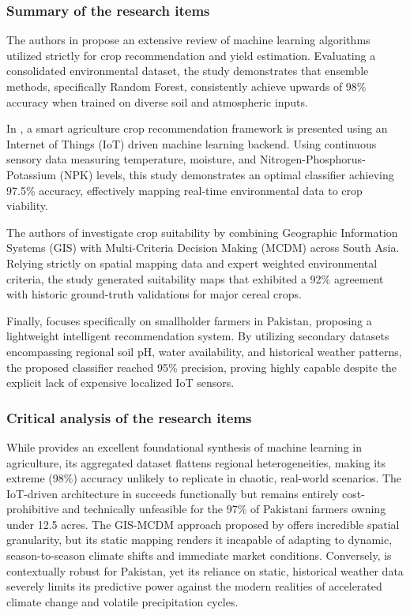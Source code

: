 \subsubsection{Summary of the research items}
The authors in \cite{kumar2023machine} propose an extensive review of machine learning algorithms utilized strictly for crop recommendation and yield estimation. Evaluating a consolidated environmental dataset, the study demonstrates that ensemble methods, specifically Random Forest, consistently achieve upwards of 98\% accuracy when trained on diverse soil and atmospheric inputs.

In \cite{udutalapally2021smart}, a smart agriculture crop recommendation framework is presented using an Internet of Things (IoT) driven machine learning backend. Using continuous sensory data measuring temperature, moisture, and Nitrogen-Phosphorus-Potassium (NPK) levels, this study demonstrates an optimal classifier achieving 97.5\% accuracy, effectively mapping real-time environmental data to crop viability.

The authors of \cite{bandara2022GIS} investigate crop suitability by combining Geographic Information Systems (GIS) with Multi-Criteria Decision Making (MCDM) across South Asia. Relying strictly on spatial mapping data and expert weighted environmental criteria, the study generated suitability maps that exhibited a 92\% agreement with historic ground-truth validations for major cereal crops.

Finally, \cite{ali2023towards} focuses specifically on smallholder farmers in Pakistan, proposing a lightweight intelligent recommendation system. By utilizing secondary datasets encompassing regional soil pH, water availability, and historical weather patterns, the proposed classifier reached 95\% precision, proving highly capable despite the explicit lack of expensive localized IoT sensors.

\subsubsection{Critical analysis of the research items}
While \cite{kumar2023machine} provides an excellent foundational synthesis of machine learning in agriculture, its aggregated dataset flattens regional heterogeneities, making its extreme (98\%) accuracy unlikely to replicate in chaotic, real-world scenarios. The IoT-driven architecture in \cite{udutalapally2021smart} succeeds functionally but remains entirely cost-prohibitive and technically unfeasible for the 97\% of Pakistani farmers owning under 12.5 acres. The GIS-MCDM approach proposed by \cite{bandara2022GIS} offers incredible spatial granularity, but its static mapping renders it incapable of adapting to dynamic, season-to-season climate shifts and immediate market conditions. Conversely, \cite{ali2023towards} is contextually robust for Pakistan, yet its reliance on static, historical weather data severely limits its predictive power against the modern realities of accelerated climate change and volatile precipitation cycles.

